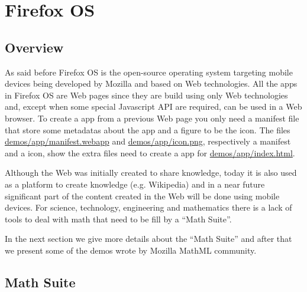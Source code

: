 \section{Firefox OS}
\label{sec:firefoxOS}

\subsection{Overview}

As said before
Firefox OS is the open-source operating system targeting mobile devices being
developed by Mozilla and based on Web technologies. All the apps in Firefox OS
are Web pages since they are build using only Web technologies and, except when
some special Javascript API are required, can be used in a Web browser.
To create a app from a previous Web page you only need a manifest
file that store some metadatas about the app and a figure to be the icon. The
files
\href{http://fred-wang.github.io/MathUI2014/demos/app/manifest.webapp}{demos/app/manifest.webapp}
and
\href{http://fred-wang.github.io/MathUI2014/demos/app/icon.png}{demos/app/icon.png},
respectively a manifest and a icon,
show the extra files need to create a app for
\href{http://fred-wang.github.io/MathUI2014/demos/app/index.html}{demos/app/index.html}.

Although the Web was initially created to share knowledge, today it is also used
as a platform to create knowledge (e.g. Wikipedia) and in a near future
significant part of the content created in the Web will be done using mobile
devices. For science, technology, engineering and mathematics there is a lack of
tools to deal with math that need to be fill by a ``Math Suite''.

In the next section we give more details about the ``Math Suite'' and
after that we present some of the demos wrote by Mozilla MathML community.

\subsection{Math Suite}

